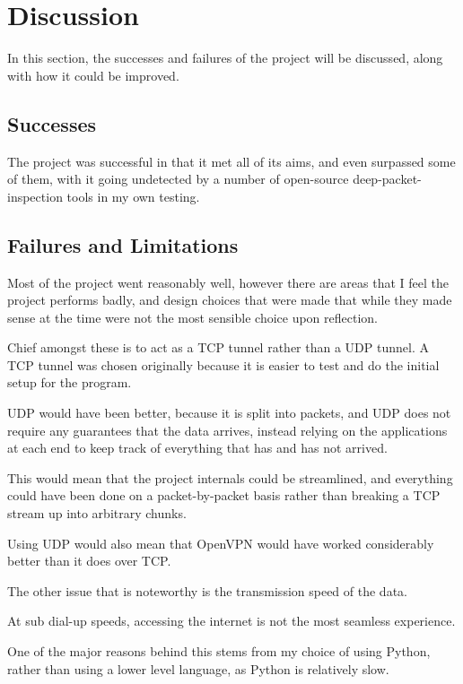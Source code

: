 \section{Discussion}
In this section, the successes and failures of the project will be discussed, along with how it could be improved.
\subsection{Successes}
The project was successful in that it met all of its aims, and even surpassed some of them, with it going undetected by a number of open-source deep-packet-inspection tools in my own testing.

\subsection{Failures and Limitations}
Most of the project went reasonably well, however there are areas that I feel the project performs badly, and design choices that were made that while they made sense at the time were not the most sensible choice upon reflection.\par
Chief amongst these is to act as a TCP tunnel rather than a UDP tunnel. A TCP tunnel was chosen originally because it is easier to test and do the initial setup for the program.\par
UDP would have been better, because it is split into packets, and UDP does not require any guarantees that the data arrives, instead relying on the applications at each end to keep track of everything that has and has not arrived.\par
This would mean that the project internals could be streamlined, and everything could have been done on a packet-by-packet basis rather than breaking a TCP stream up into arbitrary chunks.\par
Using UDP would also mean that OpenVPN would have worked considerably better than it does over TCP\@.\par
The other issue that is noteworthy is the transmission speed of the data.\par
At sub dial-up speeds, accessing the internet is not the most seamless experience.\par
One of the major reasons behind this stems from my choice of using Python, rather than using a lower level language, as Python is relatively slow.
